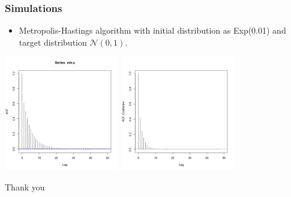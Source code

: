 \documentclass [xcolor=svgnames, t] {beamer}
\begin{document}
\begin{frame}
    \frametitle{Simulations}
    \begin{itemize}
        \item Metropolis-Hastings algorithm with initial distribution as Exp(0.01) and target distribution $\mathcal{N}(0, 1)$.
    \end{itemize}
    \vspace{2em}
    \centering
        \includegraphics[width=5cm]{acf_mh.jpg}
        \includegraphics[width=5cm]{acf_mh_chatterjee.jpg}
\end{frame}

\begin{frame}
    \vspace{8em}
    \centering
    \begin{LARGE}
    Thank you
    \end{LARGE}

\end{frame}

%         
%         
\end{document}
